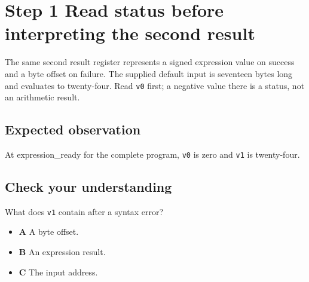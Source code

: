 \section{Step 1 Read status before interpreting the second result}\label{expression-s01}

The same second result register represents a signed expression value on success and a byte offset on failure. The supplied default input is seventeen bytes long and evaluates to twenty-four. Read \texttt{v0} first; a negative value there is a status, not an arithmetic result.

\subsection{Expected observation}
At expression\_ready for the complete program, \texttt{v0} is zero and \texttt{v1} is twenty-four.

\subsection{Check your understanding}
What does \texttt{v1} contain after a syntax error?

\begin{itemize}
  \item \textbf{A} A byte offset.
  \item \textbf{B} An expression result.
  \item \textbf{C} The input address.
\end{itemize}
